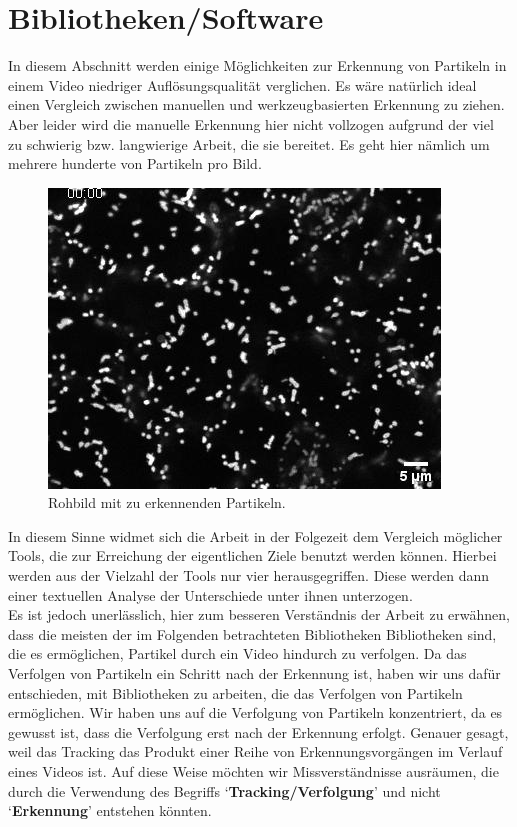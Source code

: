 \chapter{Bibliotheken/Software \label{kap1}}

In diesem  Abschnitt werden einige Möglichkeiten zur Erkennung von Partikeln in einem Video niedriger Auflösungsqualität verglichen. Es wäre natürlich ideal einen Vergleich zwischen manuellen und werkzeugbasierten Erkennung zu ziehen. Aber leider wird die manuelle Erkennung hier nicht vollzogen aufgrund der viel zu schwierig bzw. langwierige Arbeit, die sie bereitet. Es geht hier nämlich um mehrere hunderte von Partikeln pro Bild.\\
 
\begin{figure}[H]
    \centering
    \includegraphics[scale=0.9]{Grafiken/trackpyBilder/video-frame00001.png}
    \caption{Rohbild mit zu erkennenden Partikeln.}
    \label{fig:kap1_rohbild}
\end{figure}

In diesem Sinne widmet sich die Arbeit in der Folgezeit dem Vergleich möglicher Tools, die zur Erreichung der eigentlichen Ziele benutzt werden können. Hierbei werden aus der Vielzahl der Tools nur vier herausgegriffen. Diese werden dann einer textuellen Analyse der Unterschiede unter ihnen unterzogen.\\

Es ist jedoch unerlässlich, hier zum besseren Verständnis der Arbeit zu erwähnen, dass die meisten der im Folgenden betrachteten Bibliotheken Bibliotheken sind, die es ermöglichen, Partikel durch ein Video hindurch zu verfolgen. Da das Verfolgen von Partikeln ein Schritt nach der Erkennung ist, haben wir uns dafür entschieden, mit Bibliotheken zu arbeiten, die das Verfolgen von Partikeln ermöglichen. Wir haben uns auf die Verfolgung von Partikeln konzentriert, da es gewusst ist, dass die Verfolgung erst nach der Erkennung erfolgt. Genauer gesagt, weil das Tracking das Produkt einer Reihe von Erkennungsvorgängen im Verlauf eines Videos ist.
Auf diese Weise möchten wir Missverständnisse ausräumen, die durch die Verwendung des Begriffs `\textbf{Tracking/Verfolgung}' und nicht `\textbf{Erkennung}' entstehen könnten.  

